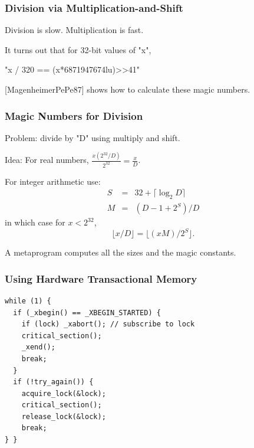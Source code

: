\documentclass[xcolor=dvipsnames,14pt]{beamer}
\newcommand{\smmpunt}[1]{#1}
\begin{document}
\smmpunt{}
\begin{frame}[fragile]
\frametitle{Division via Multiplication-and-Shift}

Division is slow.  Multiplication is fast.

It turns out that for 32-bit values of "x",
\begin{center}
"x / 320 == (x*6871947674lu)>>41"
\end{center}

[MagenheimerPePe87] shows how to calculate these magic numbers. 

\hfill{}\hspace*{1in}
\end{frame}
{}

\smmpunt{}
\begin{frame}[fragile]
\frametitle{Magic Numbers for Division}

Problem: divide by "D" using multiply and shift.

Idea:  For real numbers, $\frac{x (2^{32}/D)}{2^{32}} = \frac{x}{D}$.

For integer arithmetic use:
\begin{eqnarray*}
S & = & 32+\lceil \log_2 D \rceil \\
M & = & (D-1+2^S)/D 
\end{eqnarray*}
in which case for $x<2^{32}$,
\[
\lfloor x/D \rfloor = \lfloor (xM)/2^S \rfloor.
\]

A metaprogram computes all the sizes and the magic constants.
\end{frame}
{}

\smmpunt{}
\begin{frame}[fragile]
\frametitle{Using Hardware Transactional Memory}

\begin{verbatim}
while (1) {
  if (_xbegin() == _XBEGIN_STARTED) {
    if (lock) _xabort(); // subscribe to lock
    critical_section();
    _xend();
    break;
  }
  if (!try_again()) {
    acquire_lock(&lock);
    critical_section();
    release_lock(&lock);
    break;
} }
\end{verbatim}
\end{frame}
{}
\end{document}
